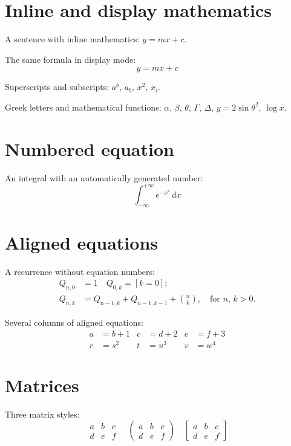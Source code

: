 \documentclass[a4paper,12pt,fleqn,leqno]{article}
\begin{document}
\section{Inline and display mathematics}

A sentence with inline mathematics: $y = mx + c$.

The same formula in display mode:
\[
y = mx + c
\]

Superscripts and subscripts:
$a^{b}$, $a_{b}$, $x^{2}$, $x_{i}$.

Greek letters and mathematical functions:
$\alpha$, $\beta$, $\theta$, $\Gamma$, $\Delta$,
$y = 2\sin\theta^{2}$, $\log x$.

\section{Numbered equation}

An integral with an automatically generated number:
\begin{equation}
\int_{-\infty}^{+\infty} e^{-x^{2}} \, dx
\end{equation}

\section{Aligned equations}

A recurrence without equation numbers:
\begin{align*}
Q_{n,0} &= 1 \quad Q_{0,k} = [k=0]; \\
Q_{n,k} &= Q_{n-1,k}+Q_{n-1,k-1}+\binom{n}{k},
           \quad\text{for $n$, $k>0$.}
\end{align*}

Several columns of aligned equations:
\begin{align*}
a &= b+1   & c &= d+2   & e &= f+3 \\
r &= s^{2} & t &= u^{3} & v &= w^{4}
\end{align*}

\section{Matrices}

Three matrix styles:
\[
\begin{matrix}
a & b & c \\
d & e & f
\end{matrix}
\quad
\begin{pmatrix}
a & b & c \\
d & e & f
\end{pmatrix}
\quad
\begin{bmatrix}
a & b & c \\
d & e & f
\end{bmatrix}
\]
\end{document}
